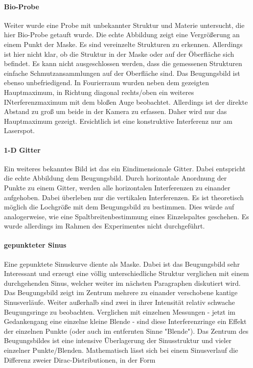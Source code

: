 \paragraph{Bio-Probe} Weiter wurde eine Probe mit unbekannter Struktur und Materie untersucht, die hier Bio-Probe getauft wurde. Die echte Abbildung zeigt eine Vergrößerung an einem Punkt der Maske. Es sind vereinzelte Strukturen zu erkennen. Allerdings ist hier nicht klar, ob die Struktur in der Maske oder auf der Öberfläche sich befindet. Es kann nicht ausgeschlossen werden, dass die gemessenen Strukturen einfache Schmutzansammlungen auf der Oberfläche sind. Das Beugungsbild ist ebenso unbefriedigend. In Fourierraum wurden neben dem gezeigten Hauptmaximum, in Richtung diagonal rechts/oben ein weiteres INterferenzmaximum mit dem bloßen Auge beobachtet. Allerdings ist der direkte Abstand zu groß um beide in der Kamera zu erfassen. Daher wird nur das Hauptmaximum gezeigt. Ersichtlich ist eine konstruktive Interferenz nur am Laserspot.

\paragraph{1-D Gitter} Ein weiteres bekanntes Bild ist das ein Eindimensionale Gitter. Dabei entspricht die echte Abbildung dem Beugungsbild. Durch horizontale Anordnung der Punkte zu einem Gitter, werden alle horizontalen Interferenzen zu einander aufgehoben. Dabei überleben nur die vertikalen Interferenzen. Es ist theoretisch möglich die Lochgröße mit dem Beugungsbild zu bestimmen. Dies würde auf analogerweise, wie eine Spaltbreitenbestimmung eines Einzelspaltes geschehen. Es wurde allerdings im Rahmen des Experimentes nicht durchgeführt.

\paragraph{gepunkteter Sinus} Eine gepunktete Sinuskurve diente als Maske. Dabei ist das Beugungsbild sehr Interessant und erzeugt eine völlig unterschiedliche Struktur verglichen mit einem durchgehenden Sinus, welcher weiter im nächsten Paragraphen diskutiert wird. Das Beugungsbild zeigt im Zentrum mehrere zu einander verschobene kantige Sinusverläufe. Weiter außerhalb sind zwei in ihrer Intensität relativ schwache Beugungsringe zu beobachten. Verglichen mit einzelnen Messungen - jetzt im Gedankengang eine einzelne kleine Blende - sind diese Interferenzringe ein Effekt der einzelnen Punkte (oder auch im entfernten Sinne "Blende"). Das Zentrum des Beugungsbildes ist eine intensive Überlagerung der Sinusstruktur und vieler einzelner Punkte/Blenden. Mathematisch lässt sich bei einem Sinusverlauf die Differenz zweier Dirac-Distributionen, in der Form

